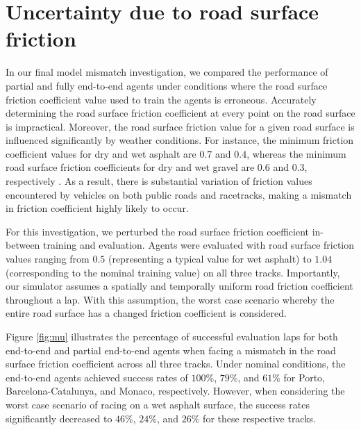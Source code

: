 \section{Uncertainty due to road surface friction}

In our final model mismatch investigation, we compared the performance of partial and fully end-to-end agents under conditions where the road surface friction coefficient value used to train the agents is erroneous.
Accurately determining the road surface friction coefficient at every point on the road surface is impractical.
Moreover, the road surface friction value for a given road surface is influenced significantly by weather conditions.
For instance, the minimum friction coefficient values for dry and wet asphalt are $0.7$ and $0.4$, whereas the minimum road surface friction coefficients for dry and wet gravel are $0.6$ and $0.3$, respectively \cite{Novikov2018}. 
As a result, there is substantial variation of friction values encountered by vehicles on both public roads and racetracks, making a mismatch in friction coefficient highly likely to occur.

For this investigation, we perturbed the road surface friction coefficient in-between training and evaluation.
Agents were evaluated with road surface friction values ranging from $0.5$ (representing a typical value for wet asphalt) to $1.04$ (corresponding to the nominal training value) on all three tracks. 
Importantly, our simulator assumes a spatially and temporally uniform road friction coefficient throughout a lap.
With this assumption, the worst case scenario whereby the entire road surface has a changed friction coefficient is considered.


Figure \ref{fig:mu} illustrates the percentage of successful evaluation laps for both end-to-end and partial end-to-end agents when facing a mismatch in the road surface friction coefficient across all three tracks. 
Under nominal conditions, the end-to-end agents achieved success rates of $100\%$, $79\%$, and $61\%$ for Porto, Barcelona-Catalunya, and Monaco, respectively. However, when considering the worst case scenario of racing on a wet asphalt surface, the success rates significantly decreased to $46\%$, $24\%$, and $26\%$ for these respective tracks.

